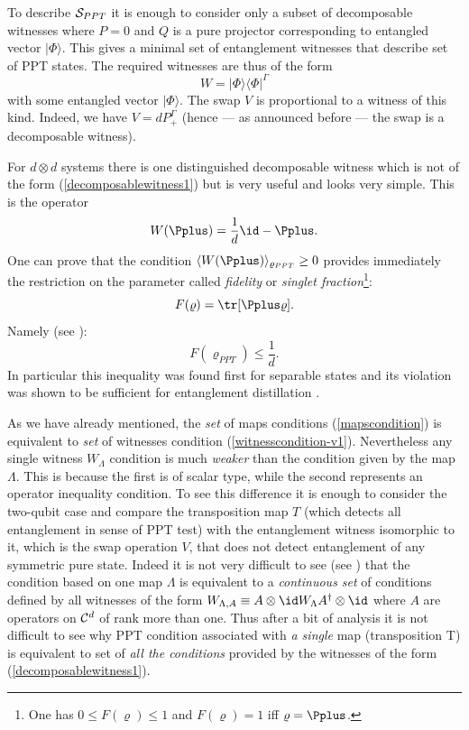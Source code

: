 \documentclass[twocolumn,aps,rmp]{revtex4}
\begin{document}
To describe ${\cal S}_{PPT}$ it is enough to consider only a subset of
decomposable witnesses where $P=0$ and $Q$ is a pure projector
corresponding to entangled vector $|\Phi\rangle$. This gives a minimal
set of entanglement witnesses that describe set of PPT states. The
required witnesses are thus of the form
\begin{equation}
W=|\Phi \rangle \langle \Phi|^{\Gamma}
\label{decomposablewitness1}
\end{equation}
with some entangled vector $|\Phi\rangle$. The swap $V$ is
proportional to a witness of this kind. Indeed, we have $V=d
P_{+}^{\Gamma}$ (hence --- as announced before --- the swap is a
decomposable witness).

For $d \otimes d$ systems there is one distinguished decomposable
witness which is not of the form (\ref{decomposablewitness1}) but is
very useful and looks very simple. This is the operator
\begin{equation}
W(\Pplus)={1\over d}\id-\Pplus.
\end{equation}
One can prove that the condition $\langle W(\Pplus)
\rangle_{\varrho_{PPT}}\geq 0$ provides immediately the restriction on
the parameter called {\it fidelity} or {\it singlet
  fraction}\footnote{ One has $0 \leq F(\varrho) \leq 1$ and
  $F(\varrho)=1$ iff $\varrho=\Pplus$.  }:
\begin{equation}
F(\varrho)={\tr}[\Pplus\varrho].
\end{equation}
Namely (see \cite{Rains2001}):
\begin{equation}
F(\varrho_{PPT}) \leq \frac{1}{d}.
\end{equation}
In particular this inequality was found first for separable states and
its violation was shown to be sufficient for entanglement distillation
\cite{reduction}.

As we have already mentioned, the {\it set} of maps conditions
(\ref{mapscondition}) is equivalent to {\it set} of witnesses
condition (\ref{witnesscondition-v1}). Nevertheless any single witness
$W_\Lambda$ condition is much {\it weaker} than the condition given by
the map $\Lambda$. This is because the first is of scalar type, while
the second represents an operator inequality condition. To see this
difference it is enough to consider the two-qubit case and compare the
transposition map $T$ (which detects all entanglement in sense of PPT
test) with the entanglement witness isomorphic to it, which is the
swap operation $V$, that does not detect entanglement of any symmetric
pure state. Indeed it is not very difficult to see (see \cite{PHAE})
that the condition based on one map $\Lambda$ is equivalent to a {\it
  continuous set} of conditions defined by all witnesses of the form
$W_{\Lambda,A}\equiv A \otimes \id W_{\Lambda}A^{\dagger} \otimes \id$
where $A$ are operators on ${\cal C}^{d}$ of rank more than one. Thus
after a bit of analysis it is not difficult to see why PPT condition
associated with {\it a single} map (transposition T) is equivalent to
set of {\it all the conditions} provided by the witnesses of the form
(\ref{decomposablewitness1}).
\end{document}
